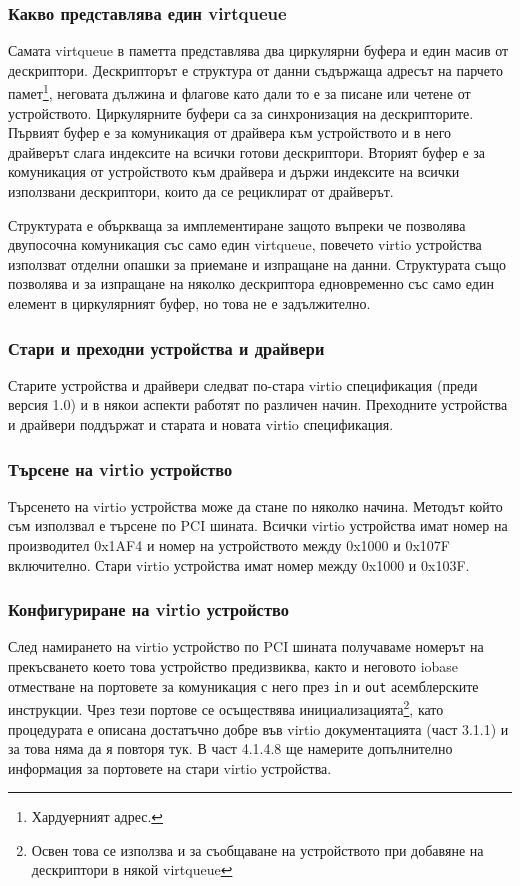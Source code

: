 \subsubsection{Какво представлява един virtqueue} \label{virtqueue}
Самата virtqueue в паметта представлява два циркулярни буфера и един масив от дескриптори. Дескрипторът е структура от данни съдържаща адресът на парчето памет\footnote{Хардуерният адрес.}, неговата дължина и флагове като дали то е за писане или четене от устройството. Циркулярните буфери са за синхронизация на дескрипторите. Първият буфер е за комуникация от драйвера към устройството и в него драйверът слага индексите на всички готови дескриптори. Вторият буфер е за комуникация от устройството към драйвера и държи индексите на всички използвани дескриптори, които да се рециклират от драйверът.

Структурата е объркваща за имплементиране защото въпреки че позволява двупосочна комуникация със само един virtqueue, повечето virtio устройства използват отделни опашки за приемане и изпращане на данни. Структурата също позволява и за изпращане на няколко дескриптора едновременно със само един елемент в циркулярният буфер, но това не е задължително.

\subsubsection{Стари и преходни устройства и драйвери}
Старите устройства и драйвери следват по-стара virtio спецификация (преди версия 1.0) и в някои аспекти работят по различен начин. Преходните устройства и драйвери поддържат и старата и новата virtio спецификация.

\subsubsection{Търсене на virtio устройство}
Търсенето на virtio устройства може да стане по няколко начина. Методът който съм използвал е търсене по PCI шината. Всички virtio устройства имат номер на производител 0x1AF4 и номер на устройството между 0x1000 и 0x107F включително. Стари virtio устройства имат номер между 0x1000 и 0x103F.

\subsubsection{Конфигуриране на virtio устройство}
След намирането на virtio устройство по PCI шината получаваме номерът на прекъсването което това устройство предизвиква, както и неговото iobase отместване на портовете за комуникация с него през {\tt in} и {\tt out} асемблерските инструкции. Чрез тези портове се осъществява инициализацията\footnote{Освен това се използва и за съобщаване на устройството при добавяне на дескриптори в някой virtqueue}, като процедурата е описана достатъчно добре във virtio документацията\parencite{virtiodocs} (част 3.1.1) и за това няма да я повторя тук. В част 4.1.4.8 ще намерите допълнително информация за портовете на стари virtio устройства.

